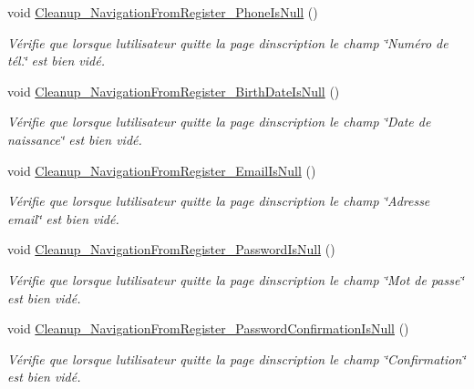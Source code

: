\begin{DoxyCompactItemize}
void \hyperlink{class_boxes_1_1_tests_1_1_register_view_model_tests_a63f5afd45d175eb17e0979e064d4f403}{Cleanup\+\_\+\+Navigation\+From\+Register\+\_\+\+Phone\+Is\+Null} ()
\begin{DoxyCompactList}\small\item\em Vérifie que lorsque l\textquotesingle{}utilisateur quitte la page d\textquotesingle{}inscription le champ \char`\"{}\+Numéro de tél.\char`\"{} est bien vidé. \end{DoxyCompactList}\item 
void \hyperlink{class_boxes_1_1_tests_1_1_register_view_model_tests_a1171e9477ca9c1b90880740f0bf34c4e}{Cleanup\+\_\+\+Navigation\+From\+Register\+\_\+\+Birth\+Date\+Is\+Null} ()
\begin{DoxyCompactList}\small\item\em Vérifie que lorsque l\textquotesingle{}utilisateur quitte la page d\textquotesingle{}inscription le champ \char`\"{}\+Date de naissance\char`\"{} est bien vidé. \end{DoxyCompactList}\item 
void \hyperlink{class_boxes_1_1_tests_1_1_register_view_model_tests_a15c6b9db02a917578ca07267aaaf6ff4}{Cleanup\+\_\+\+Navigation\+From\+Register\+\_\+\+Email\+Is\+Null} ()
\begin{DoxyCompactList}\small\item\em Vérifie que lorsque l\textquotesingle{}utilisateur quitte la page d\textquotesingle{}inscription le champ \char`\"{}\+Adresse email\char`\"{} est bien vidé. \end{DoxyCompactList}\item 
void \hyperlink{class_boxes_1_1_tests_1_1_register_view_model_tests_ab211efb578d12bb20eabca228cc5751e}{Cleanup\+\_\+\+Navigation\+From\+Register\+\_\+\+Password\+Is\+Null} ()
\begin{DoxyCompactList}\small\item\em Vérifie que lorsque l\textquotesingle{}utilisateur quitte la page d\textquotesingle{}inscription le champ \char`\"{}\+Mot de passe\char`\"{} est bien vidé. \end{DoxyCompactList}\item 
void \hyperlink{class_boxes_1_1_tests_1_1_register_view_model_tests_a81930cd634bf89550044e02ab43056de}{Cleanup\+\_\+\+Navigation\+From\+Register\+\_\+\+Password\+Confirmation\+Is\+Null} ()
\begin{DoxyCompactList}\small\item\em Vérifie que lorsque l\textquotesingle{}utilisateur quitte la page d\textquotesingle{}inscription le champ \char`\"{}\+Confirmation\char`\"{} est bien vidé. \end{DoxyCompactList}\item 

\end{DoxyCompactItemize}
